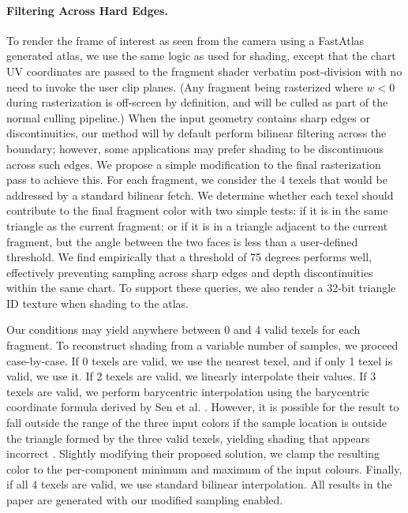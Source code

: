 \paragraph*{Filtering Across Hard Edges.} To render the frame of interest as seen from the camera using a FastAtlas generated atlas, we use the same logic as used for shading, except that the chart UV coordinates are passed to the fragment shader verbatim post-division with no need to invoke the user clip planes. (Any fragment being rasterized where $w<0$ during rasterization is off-screen by definition, and will be culled as part of the normal culling pipeline.) When the input geometry contains sharp edges or discontinuities, our method will by default perform bilinear filtering across the boundary; however, some applications may prefer shading to be discontinuous across such edges. We propose a simple modification to the final rasterization pass to achieve this. For each fragment, we consider the 4 texels that would be addressed by a standard bilinear fetch. We determine whether each texel should contribute to the final fragment color with two simple tests: if it is in the same triangle as the current fragment; or if it is in a triangle adjacent to the current fragment, but the angle between the two faces is less than a user-defined threshold. We find empirically that a threshold of 75 degrees performs well, effectively preventing sampling across sharp edges and depth discontinuities within the same chart. To support these queries, we also render a 32-bit triangle ID texture when shading to the atlas.

Our conditions may yield anywhere between 0 and 4 valid texels for each fragment. To reconstruct shading from a variable number of samples, we proceed case-by-case. If 0 texels are valid, we use the nearest texel, and if only 1 texel is valid, we use it. If 2 texels are valid, we linearly interpolate their values. If 3 texels are valid, we perform barycentric interpolation using the barycentric coordinate formula derived by Sen et al. \cite{Sen2004SilmapTex}. However, it is possible for the result to fall outside the range of the three input colors if the sample location is outside the triangle formed by the three valid texels, yielding shading that appears incorrect \cite{Sen2004SilmapTex}. Slightly modifying their proposed solution, we clamp the resulting color to the per-component minimum and maximum of the input colours. Finally, if all 4 texels are valid, we use standard bilinear interpolation. All results in the paper are generated with our modified sampling enabled.

